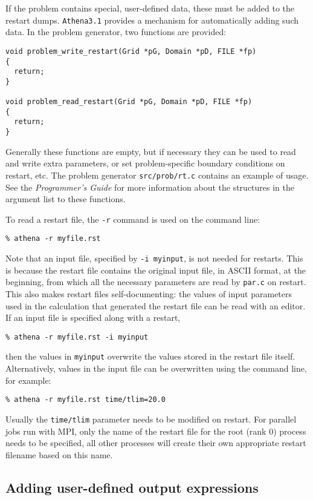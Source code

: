 If the problem contains special, user-defined data, these must be added to the
restart dumps.  {\tt Athena3.1} provides a mechanism for automatically adding
such data.  In the problem generator, two functions are provided:
\begin{verbatim}
void problem_write_restart(Grid *pG, Domain *pD, FILE *fp)
{
  return;
}

void problem_read_restart(Grid *pG, Domain *pD, FILE *fp)
{
  return;
}
\end{verbatim}
Generally these functions are empty, but if necessary they can be used
to read and write extra parameters, or set problem-specific boundary
conditions on restart, etc.  The problem generator {\tt src/prob/rt.c}
contains an example of usage.  See the {\em Programmer's Guide} for more
information about the structures in the argument list to these functions.

To read a restart file, the {\tt -r} command is used on the command line:
\begin{verbatim}
% athena -r myfile.rst
\end{verbatim}
Note that an input file, specified by {\tt -i myinput}, is not needed for
restarts.  This is because the restart file contains the original input file,
in ASCII format, at the beginning, from which all the necessary parameters
are read by {\tt par.c} on restart.  This also makes restart files self-documenting: the values of input parameters used in the calculation that generated
the restart file can be read with an editor.  If an input file is specified
along with a restart,
\begin{verbatim}
% athena -r myfile.rst -i myinput
\end{verbatim}
then the values in {\tt myinput} overwrite the values stored in the restart file
itself.  Alternatively, values in the input file can be overwritten using the
command line, for example:
\begin{verbatim}
% athena -r myfile.rst time/tlim=20.0
\end{verbatim}
Usually the {\tt time/tlim} parameter needs to be modified on restart.
For parallel jobs run with MPI, only the name of the restart file for the
root (rank 0) process needs to be specified, all other processes will 
create their own appropriate restart filename based on this name.

\subsection{Adding user-defined output expressions}

